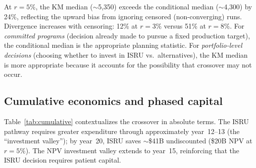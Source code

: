 \documentclass[5p,twocolumn]{elsarticle}
\begin{document}
At $r = 5\%$, the KM median ($\sim$5{,}350) exceeds the conditional median ($\sim$4{,}300) by 24\%, reflecting the upward bias from ignoring censored (non-converging) runs. Divergence increases with censoring: 12\% at $r = 3\%$ versus 51\% at $r = 8\%$. For \emph{committed programs} (decision already made to pursue a fixed production target), the conditional median is the appropriate planning statistic. For \emph{portfolio-level decisions} (choosing whether to invest in ISRU vs.\ alternatives), the KM median is more appropriate because it accounts for the possibility that crossover may not occur.

\subsection{Cumulative economics and phased capital}
\label{sec:phased_capital}

Table~\ref{tab:cumulative} contextualizes the crossover in absolute terms. The ISRU pathway requires greater expenditure through approximately year~12--13 (the ``investment valley''); by year~20, ISRU saves $\sim$\$41B undiscounted (\$20B NPV at $r = 5\%$). The NPV investment valley extends to year~15, reinforcing that the ISRU decision requires patient capital.

\begin{table}[htbp]
\centering
\caption{Cumulative cost comparison under baseline assumptions, both undiscounted and NPV-discounted ($r = 5\%$). Units produced follow the ISRU S-curve schedule. Production is negligible before year~7 ($t < t_0 + 2$); see Table~\ref{tab:production_schedule} for the delivery schedule.}
\label{tab:cumulative}
\end{table}
\end{document}
